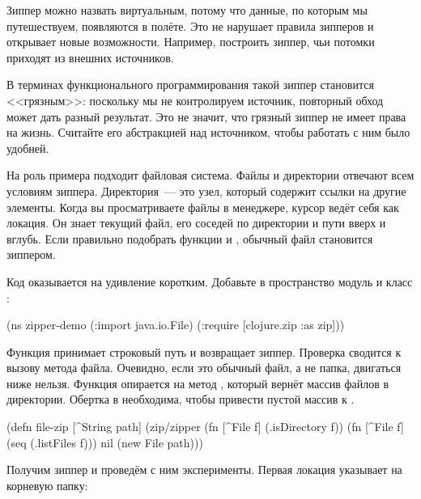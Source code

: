 Зиппер можно назвать виртуальным, потому что данные, по которым мы путешествуем,
появляются в полёте. Это не нарушает правила зипперов и открывает новые
возможности. Например, построить зиппер, чьи потомки приходят из внешних
источников.

В терминах функционального программирования такой зиппер становится <<грязным>>:
поскольку мы не контролируем источник, повторный обход может дать разный
результат. Это не значит, что грязный зиппер не имеет права на жизнь. Считайте
его абстракцией над источником, чтобы работать с ним было удобней.


На роль примера подходит файловая система. Файлы и директории отвечают всем
условиям зиппера. Директория~--- это узел, который содержит ссылки на другие
элементы. Когда вы просматриваете файлы в менеджере, курсор ведёт себя как
локация. Он знает текущий файл, его соседей по директории и пути вверх и
вглубь. Если правильно подобрать функции  и ,
обычный файл становится зиппером.

Код оказывается на удивление коротким. Добавьте в пространство модуль
 и класс :


\begin{english}
  \begin{clojure}
(ns zipper-demo
  (:import java.io.File)
  (:require
   [clojure.zip :as zip]))
  \end{clojure}
\end{english}

Функция  принимает строковый путь и возвращает зиппер. Проверка
 сводится к вызову метода  файла. Очевидно, если это
обычный файл, а не папка, двигаться ниже нельзя. Функция  опирается на
метод , который вернёт массив файлов в директории. Обертка в 
необходима, чтобы привести пустой массив к .

\begin{english}
  \begin{clojure}
(defn file-zip [^String path]
  (zip/zipper
   (fn [^File f] (.isDirectory f))
   (fn [^File f] (seq (.listFiles f)))
   nil
   (new File path)))
  \end{clojure}
\end{english}

Получим зиппер и проведём с ним эксперименты. Первая локация указывает на
корневую папку:

